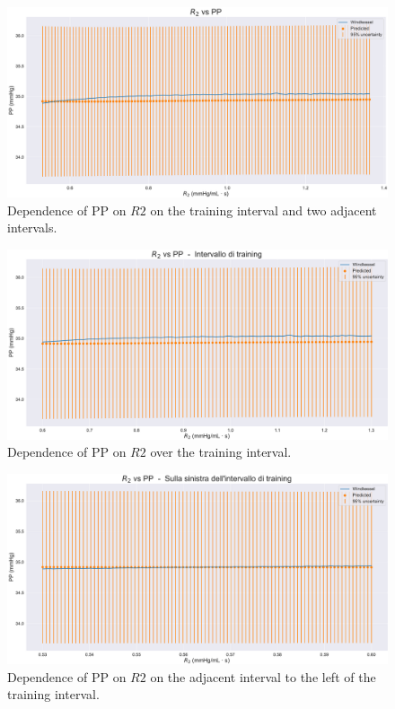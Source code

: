 \vspace{0.9cm}

\begin{figure}[!htb]
    \centering
    \includegraphics[width=1\textwidth]{images/Training (risultati)/PP/PP - R2 - full.pdf}
    \caption{Dependence of PP on $R2$ on the training interval and two adjacent intervals.}
    \label{PP - R2 - full}
\end{figure}

\vspace{0.32cm}

\begin{figure}[!htb]
    \centering
    \includegraphics[width=1\textwidth]{images/Training (risultati)/PP/PP - R2 - training.pdf}
    \caption{Dependence of PP on $R2$ over the training interval.}
    \label{PP - R2 - training}
\end{figure}

\begin{figure}
    \centering
    \includegraphics[width=1\textwidth]{images/Training (risultati)/PP/PP - R2 - sx.pdf}
    \caption{Dependence of PP on $R2$ on the adjacent interval to the left of the training interval.}
    \label{PP - R2 - sx}
\end{figure}



